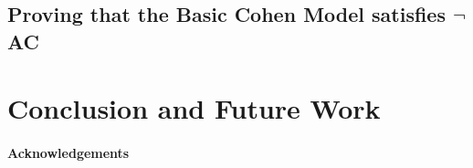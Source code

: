 \documentclass{report}
\begin{document}
\section{Proving that the Basic Cohen Model satisfies $\neg$AC}

\chapter{Conclusion and Future Work}


  
\subsubsection{Acknowledgements}

\printbibliography
\end{document}

